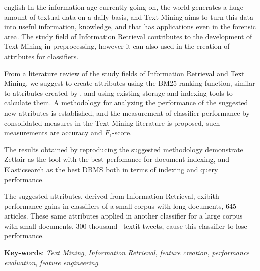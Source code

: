 \setlength{\absparsep}{18pt} %
\begin{resumo}[Abstract]
    \begin{otherlanguage*}{english}
        In the information age currently going on, the world generates a huge amount of textual data on a daily basis, and Text Mining aims to turn this data into useful information, knowledge, and that has applications even in the forensic area.
        The study field of Information Retrieval contributes to the development of Text Mining in preprocessing, however it can also used in the creation of attributes for classifiers.
        
        From a literature review of the study fields of  Information Retrieval and Text Mining, we suggest to create attributes using the BM25 ranking function, similar to attributes created by , and using existing storage and indexing tools to calculate them.
        A methodology for analyzing the performance of the suggested new attributes is established, and the measurement of classifier performance by consolidated measures in the Text Mining literature is proposed, such measurements are accuracy and $F_1$-score.

        The results obtained by reproducing the suggested methodology demonstrate Zettair as the tool with the best perfomance for document indexing, and Elasticsearch as the best DBMS both in terms of indexing and query performance.

        The suggested attributes, derived from Information Retrieval, exibith performance gains in classifiers of a small corpus with long documents, 645 articles.
        These same attributes applied in another classifier for a large corpus with small documents, 300 thousand \ textit {tweets}, cause this classifier to lose performance.
   
    	\vspace{\onelineskip}
    
    	\noindent
    	\textbf{Key-words}: \textit{Text Mining}, \textit{Information Retrieval}, \textit{feature creation}, \textit{performance evaluation}, \textit{feature engineering}.

    \end{otherlanguage*}
\end{resumo}